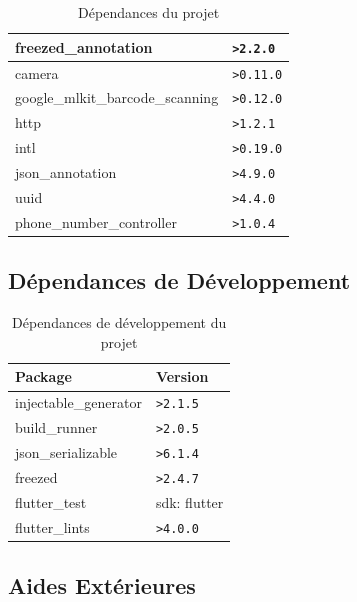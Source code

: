 \begin{table}[h!]
\begin{tabular}{|m{}|m{}|}
        freezed\_annotation              & \texttt{>2.2.0}  \\ \hline
        camera                           & \texttt{>0.11.0} \\ \hline
        google\_mlkit\_barcode\_scanning & \texttt{>0.12.0} \\ \hline
        http                             & \texttt{>1.2.1}  \\ \hline
        intl                             & \texttt{>0.19.0} \\ \hline
        json\_annotation                 & \texttt{>4.9.0}  \\ \hline
        uuid                             & \texttt{>4.4.0}  \\ \hline
        phone\_number\_controller        & \texttt{>1.0.4}  \\ \hline
    \end{tabular}
    \caption{Dépendances du projet}
    \label{table:dependencies}
\end{table}

\subsection{Dépendances de Développement}

\begin{table}[h!]
    \centering
    \begin{tabular}{|m{}|m{}|}
        \hline
        \textbf{Package}      & \textbf{Version} \\ \hline
        injectable\_generator & \texttt{>2.1.5}  \\ \hline
        build\_runner         & \texttt{>2.0.5}  \\ \hline
        json\_serializable    & \texttt{>6.1.4}  \\ \hline
        freezed               & \texttt{>2.4.7}  \\ \hline
        flutter\_test         & sdk: flutter     \\ \hline
        flutter\_lints        & \texttt{>4.0.0}  \\ \hline
    \end{tabular}
    \caption{Dépendances de développement du projet}
    \label{table:dev-dependencies}
\end{table}


\subsection{Aides Extérieures}

